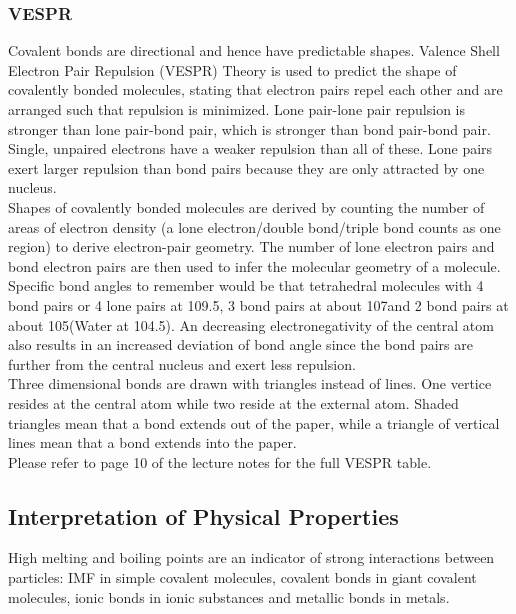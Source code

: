 \documentclass[../main]{subfiles}
\begin{document}
	\subsubsection{VESPR}

	Covalent bonds are directional and hence have predictable shapes. Valence Shell Electron Pair Repulsion (VESPR) Theory is used to predict the shape of covalently bonded molecules, stating that electron pairs repel each other and are arranged such that repulsion is minimized. Lone pair-lone pair repulsion is stronger than lone pair-bond pair, which is stronger than bond pair-bond pair. Single, unpaired electrons have a weaker repulsion than all of these. Lone pairs exert larger repulsion than bond pairs because they are only attracted by one nucleus. \\

	Shapes of covalently bonded molecules are derived by counting the number of areas of electron density (a lone electron/double bond/triple bond counts as one region) to derive electron-pair geometry. The number of lone electron pairs and bond electron pairs are then used to infer the molecular geometry of a molecule. \\

	Specific bond angles to remember would be that tetrahedral molecules with 4 bond pairs or 4 lone pairs at 109.5\degree, 3 bond pairs at about 107\degree and 2 bond pairs at about 105\degree (Water at 104.5\degree). An decreasing electronegativity of the central atom also results in an increased deviation of bond angle since the bond pairs are further from the central nucleus and exert less repulsion. \\

	Three dimensional bonds are drawn with triangles instead of lines. One vertice resides at the central atom while two reside at the external atom. Shaded triangles mean that a bond extends out of the paper, while a triangle of vertical lines mean that a bond extends into the paper. \\

	Please refer to page 10 of the lecture notes for the full VESPR table.

	\subsection{Interpretation of Physical Properties}

	High melting and boiling points are an indicator of strong interactions between particles: IMF in simple covalent molecules, covalent bonds in giant covalent molecules, ionic bonds in ionic substances and metallic bonds in metals. \\
\end{document}
